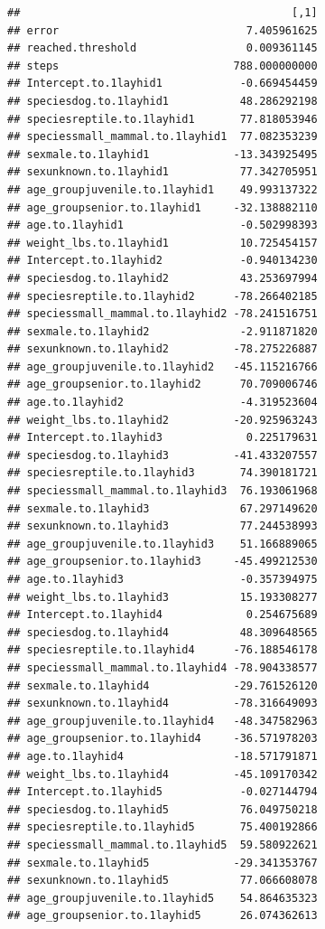 \documentclass[
]{article}
\begin{document}
\begin{verbatim}
##                                          [,1]
## error                             7.405961625
## reached.threshold                 0.009361145
## steps                           788.000000000
## Intercept.to.1layhid1            -0.669454459
## speciesdog.to.1layhid1           48.286292198
## speciesreptile.to.1layhid1       77.818053946
## speciessmall_mammal.to.1layhid1  77.082353239
## sexmale.to.1layhid1             -13.343925495
## sexunknown.to.1layhid1           77.342705951
## age_groupjuvenile.to.1layhid1    49.993137322
## age_groupsenior.to.1layhid1     -32.138882110
## age.to.1layhid1                  -0.502998393
## weight_lbs.to.1layhid1           10.725454157
## Intercept.to.1layhid2            -0.940134230
## speciesdog.to.1layhid2           43.253697994
## speciesreptile.to.1layhid2      -78.266402185
## speciessmall_mammal.to.1layhid2 -78.241516751
## sexmale.to.1layhid2              -2.911871820
## sexunknown.to.1layhid2          -78.275226887
## age_groupjuvenile.to.1layhid2   -45.115216766
## age_groupsenior.to.1layhid2      70.709006746
## age.to.1layhid2                  -4.319523604
## weight_lbs.to.1layhid2          -20.925963243
## Intercept.to.1layhid3             0.225179631
## speciesdog.to.1layhid3          -41.433207557
## speciesreptile.to.1layhid3       74.390181721
## speciessmall_mammal.to.1layhid3  76.193061968
## sexmale.to.1layhid3              67.297149620
## sexunknown.to.1layhid3           77.244538993
## age_groupjuvenile.to.1layhid3    51.166889065
## age_groupsenior.to.1layhid3     -45.499212530
## age.to.1layhid3                  -0.357394975
## weight_lbs.to.1layhid3           15.193308277
## Intercept.to.1layhid4             0.254675689
## speciesdog.to.1layhid4           48.309648565
## speciesreptile.to.1layhid4      -76.188546178
## speciessmall_mammal.to.1layhid4 -78.904338577
## sexmale.to.1layhid4             -29.761526120
## sexunknown.to.1layhid4          -78.316649093
## age_groupjuvenile.to.1layhid4   -48.347582963
## age_groupsenior.to.1layhid4     -36.571978203
## age.to.1layhid4                 -18.571791871
## weight_lbs.to.1layhid4          -45.109170342
## Intercept.to.1layhid5            -0.027144794
## speciesdog.to.1layhid5           76.049750218
## speciesreptile.to.1layhid5       75.400192866
## speciessmall_mammal.to.1layhid5  59.580922621
## sexmale.to.1layhid5             -29.341353767
## sexunknown.to.1layhid5           77.066608078
## age_groupjuvenile.to.1layhid5    54.864635323
## age_groupsenior.to.1layhid5      26.074362613

\end{verbatim}
\end{document}

